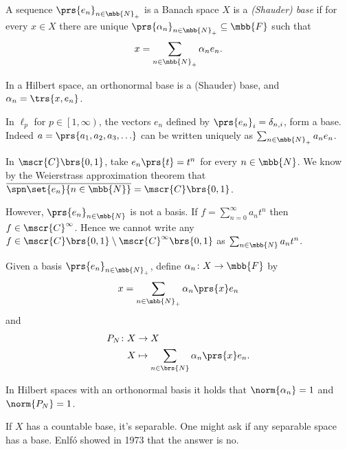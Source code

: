 \documentclass[10pt, twoside]{book}
\begin{document}
\begin{definition}
A sequence $\prs{e_n}_{n \in \mbb{N}_+}$ is a Banach space $X$ is a \emph{(Shauder) base} if for every $x \in X$ there are unique $\prs{\alpha_n}_{n \in \mbb{N}_+} \subseteq \mbb{F}$ such that
\[x = \sum_{n \in \mbb{N}_+} \alpha_n e_n \text{.}\]
\end{definition}

\begin{example}
In a Hilbert space, an orthonormal base is a (Shauder) base, and $\alpha_n = \trs{x, e_n}$.
\end{example}

\begin{example}
In $\ell_p$ for $p \in \left[ 1, \infty \right)$, the vectors $e_n$ defined by $\prs{e_n}_i = \delta_{n,i}$, form a base.
Indeed
$a = \prs{a_1, a_2, a_3, \ldots}$
can be written uniquely as $\sum_{n \in \mbb{N}_+} a_n e_n$.
\end{example}

\begin{example}
In $\mscr{C}\brs{0,1}$, take $e_n\prs{t} = t^n$ for every $n \in \mbb{N}$. We know by the Weierstrass approximation theorem that $\overline{\spn\set{e_n}{n \in \mbb{N}}} = \mscr{C}\brs{0,1}$.

However, $\prs{e_n}_{n \in \mbb{N}}$ is not a basis. If $f = \sum_{n = 0}^{\infty} a_n t^n$ then $f \in \mscr{C}^\infty$. Hence we cannot write any $f \in \mscr{C}\brs{0,1} \setminus \mscr{C}^\infty\brs{0,1}$ as $\sum_{n \in \mbb{N}} a_n t^n$.
\end{example}

\begin{definition}
Given a basis $\prs{e_n}_{n \in \mbb{N}_+}$, define $\alpha_n \colon X \to \mbb{F}$ by
\[x = \sum_{n \in \mbb{N}_+} \alpha_n\prs{x} e_n\]
and
\begin{align*}
P_N \colon X &\to X \\
X &\mapsto \sum_{n \in \brs{N}} \alpha_n\prs{x} e_n \text{.}
\end{align*}
\end{definition}

\begin{remark}
In Hilbert spaces with an orthonormal basis it holds that $\norm{\alpha_n} = 1$ and $\norm{P_N} = 1$.
\end{remark}

\begin{remark}
If $X$ has a countable base, it's separable. One might ask if any separable space has a base. Enlfó showed in 1973 that the answer is no.
\end{remark}
\end{document}
